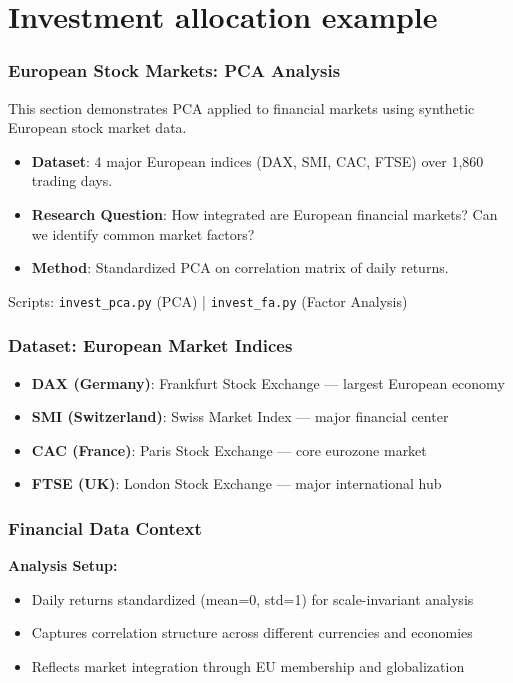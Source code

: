 \documentclass[aspectratio=169]{beamer}
\begin{document}
\section{Investment allocation example}

\begin{frame}
    \frametitle{European Stock Markets: PCA Analysis}
    This section demonstrates PCA applied to financial markets using synthetic European stock market data.
    \begin{itemize}
        \item \textbf{Dataset}: 4 major European indices (DAX, SMI, CAC, FTSE) over 1,860 trading days. \pause
        \item \textbf{Research Question}: How integrated are European financial markets? Can we identify common market factors? \pause
        \item \textbf{Method}: Standardized PCA on correlation matrix of daily returns. \pause
    \end{itemize}
    \vspace{6pt}
    Scripts: \texttt{invest\_pca.py} (PCA) | \texttt{invest\_fa.py} (Factor Analysis)
\end{frame}

\begin{frame}
    \frametitle{Dataset: European Market Indices}
    \begin{itemize}
        \item \textbf{DAX (Germany)}: Frankfurt Stock Exchange — largest European economy \pause
        \item \textbf{SMI (Switzerland)}: Swiss Market Index — major financial center \pause
        \item \textbf{CAC (France)}: Paris Stock Exchange — core eurozone market \pause
        \item \textbf{FTSE (UK)}: London Stock Exchange — major international hub \pause
    \end{itemize}
\end{frame}

\begin{frame}
    \frametitle{Financial Data Context}
    \textbf{Analysis Setup:}
    \begin{itemize}
        \item Daily returns standardized (mean=0, std=1) for scale-invariant analysis \pause
        \item Captures correlation structure across different currencies and economies \pause
        \item Reflects market integration through EU membership and globalization \pause
    \end{itemize}
\end{frame}
\end{document}
